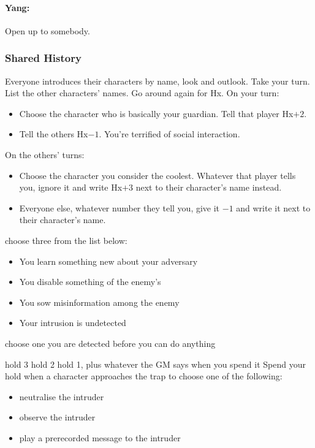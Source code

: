 \paragraph{Yang:} Open up to somebody.

\subsubsection{Shared History}
Everyone introduces their characters by name, look and outlook. Take
your turn.  List the other characters' names.  Go around again for
Hx. On your turn:
\begin{itemize} %
\item Choose the character who is basically your guardian. Tell that player Hx$+2$.
\item Tell the others Hx$-1$. You're terrified of social interaction.
\end{itemize}
On the others’ turns:
\begin{itemize} %
\item Choose the character you consider the coolest. Whatever that player tells you, ignore it and write Hx$+3$ next to their character's name instead.
\item Everyone else, whatever number they tell you, give it $-1$ and
  write it next to their character’s name.
\end{itemize}

{choose three from the list below:
\begin{itemize}
\item You learn something new about your adversary
\item You disable something of the enemy's
\item You sow misinformation among the enemy
\item Your intrusion is undetected
\end{itemize}}
{choose one}
{you are detected before you can do anything}

{hold 3}
{hold 2}
{hold 1, plus whatever the GM says when you spend it}
Spend your hold when a character approaches the trap to choose one of the following:
\begin{itemize}
\item neutralise the intruder
\item observe the intruder
\item play a prerecorded message to the intruder
\end{itemize}

